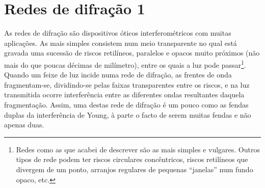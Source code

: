 \section{Redes de difração 1} 
As redes de difração são dispositivos óticos interferométricos com muitas
aplicações. As mais simples consistem num meio transparente no qual está gravada
uma sucessão de riscos retilíneos, paralelos e opacos muito próximos (não mais
do que poucas décimas de milímetro), entre os quais a luz pode
passar\footnote{Redes como as que acabei de descrever são as mais simples e
  vulgares. Outros tipos de rede podem ter riscos circulares concêntricos,
  riscos retilíneos que divergem de um ponto, arranjos regulares de pequenas
``janelas'' num fundo opaco, etc.}. Quando um
feixe de luz incide numa rede de difração, as frentes de onda fragmentam-se,
dividindo-se pelas faixas transparentes entre os riscos, e na luz transmitida
ocorre interferência entre as diferentes ondas resultantes daquela fragmentação.
Assim, uma destas rede de difração é um pouco como as fendas duplas da
interferência de Young, à parte o facto de serem muitas fendas e não apenas
duas. 

